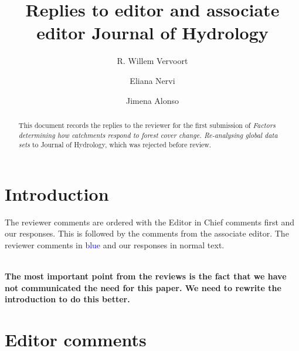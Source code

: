 \documentclass[]{elsarticle} %
\begin{document}
\begin{frontmatter}

  \title{Replies to editor and associate editor Journal of Hydrology}
    \author[]{R. Willem Vervoort%
  }
  
    \author[]{Eliana Nervi%
  }
  
    \author[]{Jimena Alonso%
  }
  
  
  \begin{abstract}
  This document records the replies to the reviewer for the first submission of \emph{Factors determining how catchments respond to forest cover change. Re-analysing global data sets} to Journal of Hydrology, which was rejected before review.
  \end{abstract}
  
 \end{frontmatter}

\hypertarget{introduction}{%
\section{Introduction}\label{introduction}}

The reviewer comments are ordered with the Editor in Chief comments first and our responses. This is followed by the comments from the associate editor. The reviewer comments in \textcolor{blue}{blue} and our responses in normal text.\\
\strut \\
\textbf{The most important point from the reviews is the fact that we have not communicated the need for this paper. We need to rewrite the introduction to do this better.}

\hypertarget{editor-comments}{%
\section{Editor comments}\label{editor-comments}}
\end{document}
